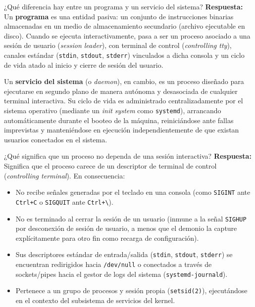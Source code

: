 \documentclass[10pt,a4paper]{article}
\begin{document}
\begin{pregunta}{¿Qué diferencia hay entre un programa y un servicio del sistema?}
    \textbf{Respuesta:} Un \textbf{programa} es una entidad pasiva: un conjunto de instrucciones binarias almacenadas en un medio de almacenamiento secundario (archivo ejecutable en disco). Cuando se ejecuta interactivamente, pasa a ser un proceso asociado a una sesión de usuario (\textit{session leader}), con terminal de control (\textit{controlling tty}), canales estándar (\texttt{stdin}, \texttt{stdout}, \texttt{stderr}) vinculados a dicha consola y un ciclo de vida atado al inicio y cierre de sesión del usuario.
    
    Un \textbf{servicio del sistema} (o \textit{daemon}), en cambio, es un proceso diseñado para ejecutarse en segundo plano de manera autónoma y desasociada de cualquier terminal interactiva. Su ciclo de vida es administrado centralizadamente por el sistema operativo (mediante un \textit{init system} como \texttt{systemd}), arrancando automáticamente durante el booteo de la máquina, reiniciándose ante fallas imprevistas y manteniéndose en ejecución independientemente de que existan usuarios conectados en el sistema.
\end{pregunta}

\begin{pregunta}{¿Qué significa que un proceso no dependa de una sesión interactiva?}
    \textbf{Respuesta:} Significa que el proceso carece de un descriptor de terminal de control (\textit{controlling terminal}). En consecuencia:
    \begin{itemize}[leftmargin=*]
        \item No recibe señales generadas por el teclado en una consola (como \texttt{SIGINT} ante \texttt{Ctrl+C} o \texttt{SIGQUIT} ante \texttt{Ctrl+\textbackslash}).
        \item No es terminado al cerrar la sesión de un usuario (inmune a la señal \texttt{SIGHUP} por desconexión de sesión de usuario, a menos que el demonio la capture explícitamente para otro fin como recarga de configuración).
        \item Sus descriptores estándar de entrada/salida (\texttt{stdin}, \texttt{stdout}, \texttt{stderr}) se encuentran redirigidos hacia \texttt{/dev/null} o conectados a través de sockets/pipes hacia el gestor de logs del sistema (\texttt{systemd-journald}).
        \item Pertenece a un grupo de procesos y sesión propia (\texttt{setsid(2)}), ejecutándose en el contexto del subsistema de servicios del kernel.
    \end{itemize}
\end{pregunta}
\end{document}

